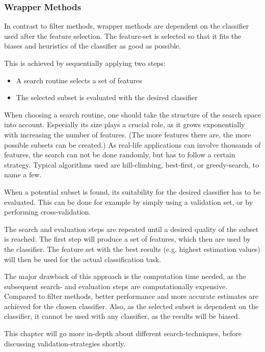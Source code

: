 \subsubsection{Wrapper Methods}
\label{sec:methods.flat.wrapper}


In contrast to filter methods, wrapper methods are dependent on the classifier used after the feature selection. 
The feature-set is selected so that it fits the biases and heuristics of the classifier as good as possible. 

This is achieved by sequentially applying two steps: 

\begin{itemize}
  \item A search routine selects a set of features 
  \item The selected subset is evaluated with the desired classifier
\end{itemize}

When choosing a search routine, one should take the structure of the search space into account.
Especially its size plays a crucial role, as it grows exponentially with increasing  the number of features. 
(The more features there are, the more possible subsets can be created.) 
As real-life applications can involve thousands of features, the search can not be done randomly, 
but has to follow a certain strategy. 
Typical algorithms used are hill-climbing, best-first, or greedy-search, to name a few.

When a potential subset is found, its suitability for the desired classifier has to be evaluated. 
This can be done for example by simply using a validation set, or by performing cross-validation.

The search and evaluation steps are repeated until a desired quality of the subset is reached. 
The first step will produce a set of features, which then are used by the classifier. 
The feature set with the best results (e.g. highest estimation values) will
then be used for the actual classification task.


The major drawback of this approach is the computation time needed, as the subsequent search- and evaluation steps are computationally expensive. 
Compared to filter methods, better performance and more accurate estimates are achieved for the chosen classifier.
Also, as the selected subset is dependent on the classifier, it cannot be used with any classifier, as the results will be biased.

This chapter will go more in-depth about different search-techniques, before discussing validation-strategies shortly. 






